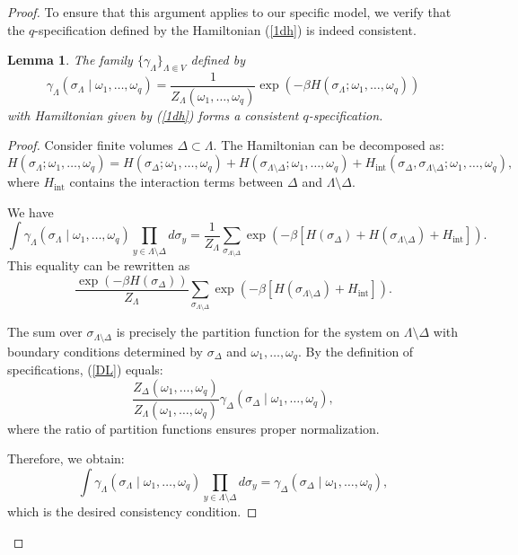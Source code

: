\documentclass[10pt,a4paper]{amsart}
\newtheorem{lemma}{Lemma}
\begin{document}
\begin{proof}
To ensure that this argument applies to our specific model, we verify that the $q$-specification defined by the Hamiltonian (\ref{1dh}) is indeed consistent.

\begin{lemma}
The family $\{\gamma_\Lambda\}_{\Lambda \Subset V}$ defined by
$$
\gamma_\Lambda(\sigma_\Lambda \mid \omega_1, \dots, \omega_q) = \frac{1}{Z_\Lambda(\omega_1, \dots, \omega_q)} \exp\left(-\beta H(\sigma_\Lambda; \omega_1, \dots, \omega_q)\right)
$$
with Hamiltonian given by (\ref{1dh}) forms a consistent $q$-specification.
\end{lemma}

\begin{proof}
Consider finite volumes $\Delta \subset \Lambda$. The Hamiltonian can be decomposed as:
$$
H(\sigma_\Lambda; \omega_1, \dots, \omega_q) = H(\sigma_\Delta; \omega_1, \dots, \omega_q) + H(\sigma_{\Lambda \setminus \Delta}; \omega_1, \dots, \omega_q) + H_{\text{int}}(\sigma_\Delta, \sigma_{\Lambda \setminus \Delta}; \omega_1, \dots, \omega_q),
$$
where $H_{\text{int}}$ contains the interaction terms between $\Delta$ and $\Lambda \setminus \Delta$.

We have
$$
\int \gamma_\Lambda(\sigma_\Lambda \mid \omega_1, \dots, \omega_q) \prod_{y \in \Lambda \setminus \Delta} d\sigma_y = \frac{1}{Z_\Lambda} \sum_{\sigma_{\Lambda \setminus \Delta}} \exp\left(-\beta[H(\sigma_\Delta) + H(\sigma_{\Lambda \setminus \Delta}) + H_{\text{int}}]\right).
$$
This equality can be rewritten as
\begin{equation}\label{DL}
\frac{\exp(-\beta H(\sigma_\Delta))}{Z_\Lambda} \sum_{\sigma_{\Lambda \setminus \Delta}} \exp\left(-\beta[H(\sigma_{\Lambda \setminus \Delta}) + H_{\text{int}}]\right).
\end{equation}

The sum over $\sigma_{\Lambda \setminus \Delta}$ is precisely the partition function for the system on $\Lambda \setminus \Delta$ with boundary conditions determined by $\sigma_\Delta$ and $\omega_1, \dots, \omega_q$. By the definition of  specifications, (\ref{DL}) equals:
$$
\frac{Z_\Delta(\omega_1, \dots, \omega_q)}{Z_\Lambda(\omega_1, \dots, \omega_q)} \gamma_\Delta(\sigma_\Delta \mid \omega_1, \dots, \omega_q),
$$
where the ratio of partition functions ensures proper normalization.

Therefore, we obtain:
$$
\int \gamma_\Lambda(\sigma_\Lambda \mid \omega_1, \dots, \omega_q) \prod_{y \in \Lambda \setminus \Delta} d\sigma_y = \gamma_\Delta(\sigma_\Delta \mid \omega_1, \dots, \omega_q),
$$
which is the desired consistency condition.
\end{proof}


\end{proof}
\end{document}
